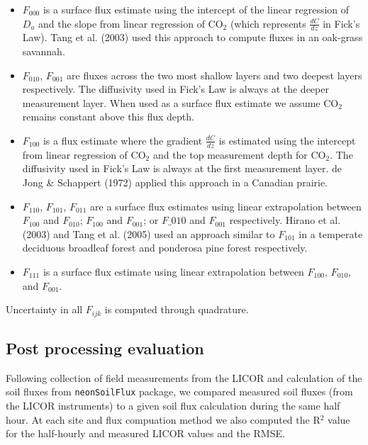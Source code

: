 \documentclass[
  letterpaper,
  DIV=11,
  numbers=noendperiod]{scrartcl}
\providecommand{\tightlist}{%
  \setlength{\itemsep}{0pt}\setlength{\parskip}{0pt}}\usepackage{longtable,booktabs,array}
\begin{document}
\begin{itemize}
\tightlist
\item
  \(F_{000}\) is a surface flux estimate using the intercept of the
  linear regression of \(D_{a}\) and the slope from linear regression of
  CO\(_{2}\) (which represents \(\frac{dC}{dz}\) in Fick's Law). Tang et
  al. (2003) used this approach to compute fluxes in an oak-grass
  savannah.
\item
  \(F_{010}\), \(F_{001}\) are fluxes across the two most shallow layers
  and two deepest layers respectively. The diffusivity used in Fick's
  Law is always at the deeper measurement layer. When used as a surface
  flux estimate we assume CO\(_{2}\) remains constant above this flux
  depth.
\item
  \(F_{100}\) is a flux estimate where the gradient \(\frac{dC}{dz}\) is
  estimated using the intercept from linear regression of CO\(_{2}\) and
  the top measurement depth for CO\(_{2}\). The diffusivity used in
  Fick's Law is always at the first measurement layer. de Jong \&
  Schappert (1972) applied this approach in a Canadian prairie.
\item
  \(F_{110}\), \(F_{101}\), \(F_{011}\) are a surface flux estimates
  using linear extrapolation between \(F_{100}\) and \(F_{010}\);
  \(F_{100}\) and \(F_{001}\); or \(F\_{010}\) and \(F_{001}\)
  respectively. Hirano et al. (2003) and Tang et al. (2005) used an
  approach similar to \(F_{101}\) in a temperate deciduous broadleaf
  forest and ponderosa pine forest respectively.
\item
  \(F_{111}\) is a surface flux estimate using linear extrapolation
  between \(F_{100}\), \(F_{010}\), and \(F_{001}\).
\end{itemize}

Uncertainty in all \(F_{ijk}\) is computed through quadrature.

\subsection{Post processing
evaluation}\label{post-processing-evaluation}

Following collection of field measurements from the LICOR and
calculation of the soil fluxes from \texttt{neonSoilFlux} package, we
compared measured soil fluxes (from the LICOR instruments) to a given
soil flux calculation during the same half hour. At each site and flux
compuation method we also computed the R\(^{2}\) value for the
half-hourly and measured LICOR values and the RMSE.
\end{document}
